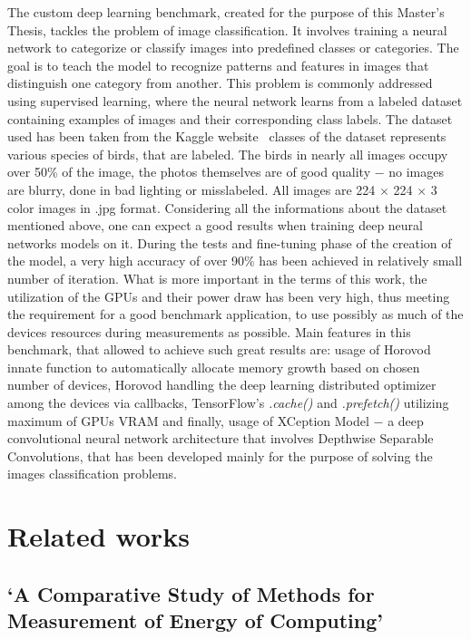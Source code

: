 The custom deep learning benchmark, created for the purpose of this Master's
Thesis, tackles the problem of image classification. It involves training
a neural network to categorize or classify images into predefined classes
or categories. The goal is to teach the model to recognize patterns and
features in images that distinguish one category from another. This problem
is commonly addressed using supervised learning, where the neural network
learns from a labeled dataset containing examples of images and their
corresponding class labels. The dataset used has been taken from the Kaggle
website~\cite{Kaggle_Dataset} classes of the dataset represents various
species of birds, that are labeled. The birds in nearly all images occupy
over 50\% of the image, the photos themselves are of good quality $-$ no images
are blurry, done in bad lighting or misslabeled. All images are 224 $\times$
224 $\times$ 3 color images in \@.jpg format. Considering all the informations
about the dataset mentioned above, one can expect a good results when training
deep neural networks models on it. During the tests and fine-tuning phase of
the creation of the model, a very high accuracy of over 90\% has been achieved
in relatively small number of iteration. What is more important in the terms
of this work, the utilization of the GPUs and their power draw has been very
high, thus meeting the requirement for a good benchmark application, to use
possibly as much of the devices resources during measurements as possible.
Main features in this benchmark, that allowed to achieve such great results
are: usage of Horovod innate function to automatically allocate memory growth
based on chosen number of devices, Horovod handling the deep learning
distributed optimizer among the devices via callbacks, TensorFlow's
\emph{.cache\@()} and \emph{.prefetch\@()} utilizing maximum of GPUs VRAM and
finally, usage of XCeption Model $-$ a deep convolutional neural network
architecture that involves Depthwise Separable Convolutions, that has been
developed mainly for the purpose of solving the images classification problems.

\section{Related works}

\subsection{`A Comparative Study of Methods for Measurement
of Energy of Computing'}

